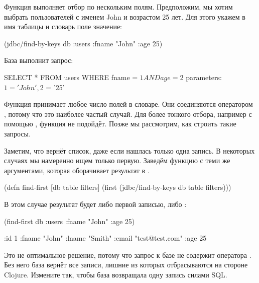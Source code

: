 Функция  выполняет отбор по нескольким полям. Предположим, мы хотим выбрать пользователей с именем John и возрастом 25 лет. Для этого укажем в  имя таблицы и словарь поле \arr значение:

\begin{english}
  \begin{clojure}
(jdbc/find-by-keys db :users {:fname "John" :age 25})
  \end{clojure}
\end{english}

База выполнит запрос:

\begin{english}
  \begin{sql}
SELECT * FROM users WHERE fname = $1 AND age = $2
parameters: $1 = 'John', $2 = '25'
  \end{sql}
\end{english}

Функция принимает любое число полей в словаре. Они соединяются оператором , потому что это наиболее частый случай. Для более тонкого отбора, например с помощью , функция не подойдёт. Позже мы рассмотрим, как строить такие запросы.

Заметим, что  вернёт список, даже если нашлась только одна запись. В некоторых случаях мы намеренно ищем только первую. Заведём функцию  с теми же аргументами, которая оборачивает результат в .

\begin{english}
  \begin{clojure}
(defn find-first [db table filters]
  (first (jdbc/find-by-keys db table filters)))
  \end{clojure}
\end{english}

В этом случае результат будет либо первой записью, либо :

\begin{english}
  \begin{clojure}
(find-first db :users {:fname "John" :age 25})

{:id 1 :fname "John" :lname "Smith"
 :email "test@test.com" :age 25}
  \end{clojure}
\end{english}

Это не оптимальное решение, потому что запрос к базе не содержит оператора . Без него база вернёт все записи, лишние из которых отбрасываются на стороне Clojure. Измените  так, чтобы база возвращала одну запись силами SQL.


